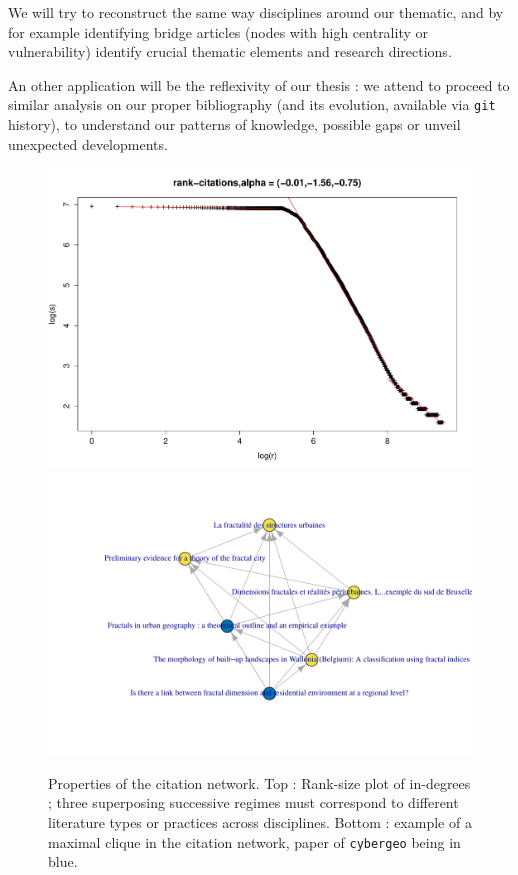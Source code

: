 We will try to reconstruct the same way disciplines around our thematic, and by for example identifying bridge articles (nodes with high centrality or vulnerability) identify crucial thematic elements and research directions.

\bigskip

An other application will be the reflexivity of our thesis : we attend to proceed to similar analysis on our proper bibliography (and its evolution, available via \texttt{git} history), to understand our patterns of knowledge, possible gaps or unveil unexpected developments.


\begin{figure}
\includegraphics[width=\textwidth]{Figures/PartI/QuantitativeEpistemo/HyperNetwork/rank-size-all}
\includegraphics[width=\textwidth]{Figures/PartI/QuantitativeEpistemo/HyperNetwork/cybclic_2cyb_13761}
\caption[Properties of the citation network]{Properties of the citation network. Top : Rank-size plot of in-degrees ; three superposing successive regimes must correspond to different literature types or practices across disciplines. Bottom : example of a maximal clique in the citation network, paper of \texttt{cybergeo} being in blue.}
\label{fig:quantepistemo:citnw}
\end{figure}



